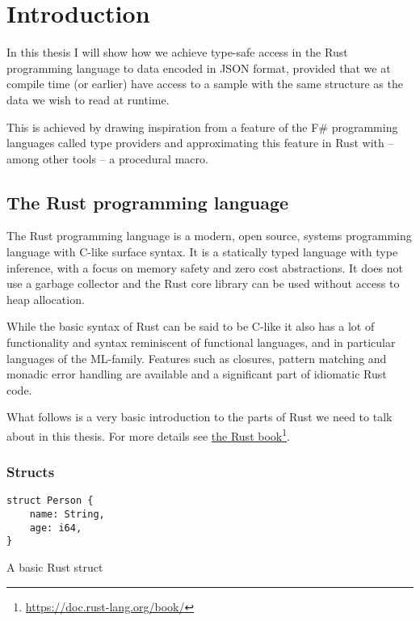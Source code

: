 
\chapter{Introduction}

In this thesis I will show how we achieve type-safe access in the Rust programming language to data encoded in JSON format, provided that we at compile time (or earlier) have access to a sample with the same structure as the data we wish to read at runtime.

This is achieved by drawing inspiration from a feature of the F\# programming languages called type providers and approximating this feature in Rust with -- among other tools -- a procedural macro.

\section{The Rust programming language}
\label{sec:rust-intro}

The Rust programming language is a modern, open source, systems programming language with C-like surface syntax. It is a statically typed language with type inference, with a focus on memory safety and zero cost abstractions. It does not use a garbage collector and the Rust core library can be used without access to heap allocation.

While the basic syntax of Rust can be said to be C-like it also has a lot of functionality and syntax reminiscent of functional languages, and in particular languages of the ML-family. Features such as closures, pattern matching and monadic error handling are available and a significant part of idiomatic Rust code.

What follows is a very basic introduction to the parts of Rust we need to talk about in this thesis. For more details see \href{https://doc.rust-lang.org/book/}{the Rust book}\footnote{\url{https://doc.rust-lang.org/book/}}.

\subsection{Structs}

\begin{listing}[ht!]
\begin{verbatim}
struct Person {
    name: String,
    age: i64,
}
\end{verbatim}
\caption{A basic Rust struct}
\label{lst:struct}
\end{listing}

